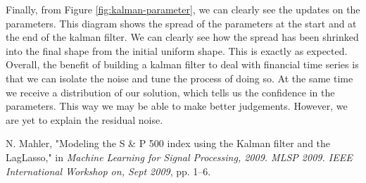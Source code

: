 \documentclass[11pt, fleqn]{article}
\begin{document}
Finally, from Figure \ref{fig:kalman-parameter}, we can clearly see the updates on the parameters. This diagram shows the spread of the parameters at the start and at the end of the kalman filter. We can clearly see how the spread has been shrinked into the final shape from the initial uniform shape. This is exactly as expected.\\

Overall, the benefit of building a kalman filter to deal with financial time series is that we can isolate the noise and tune the process of doing so. At the same time we receive a distribution of our solution, which tells us the confidence in the parameters. This way we may be able to make better judgements. However, we are yet to explain the residual noise.

\begin{thebibliography}{9}
N. Mahler, "Modeling the S \& P 500 index using the Kalman filter and the LagLasso," in \textit{Machine Learning for Signal Processing, 2009. MLSP 2009. IEEE International Workshop on, Sept 2009}, pp. 1–6.

\end{thebibliography}
\end{document}
